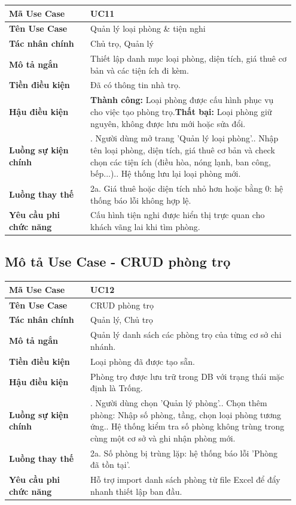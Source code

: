 \documentclass[a4paper,oneside]{report}
\begin{document}
\begin{longtable}[]{@{}>{\RaggedRight\arraybackslash}p{0.27\linewidth}>{\RaggedRight\arraybackslash}p{0.68\linewidth}@{}}
\toprule
\textbf{Mã Use Case} & UC11\tabularnewline
\midrule
\endhead
\textbf{Tên Use Case} & Quản lý loại phòng \& tiện nghi\tabularnewline
\textbf{Tác nhân chính} & Chủ trọ, Quản lý\tabularnewline
\textbf{Mô tả ngắn} & Thiết lập danh mục loại phòng, diện tích, giá thuê
cơ bản và các tiện ích đi kèm.\tabularnewline
\textbf{Tiền điều kiện} & Đã có thông tin nhà trọ.\tabularnewline
\textbf{Hậu điều kiện} & \textbf{Thành công:} Loại phòng được cấu hình phục vụ cho việc tạo phòng trọ.\newline \textbf{Thất bại:} Loại phòng giữ nguyên, không được lưu mới hoặc sửa đổi.\tabularnewline
\textbf{Luồng sự kiện chính} & 1. Người dùng mở trang
'Quản lý loại phòng'.\newline 2. Nhập tên loại phòng, diện tích,
giá thuê cơ bản và check chọn các tiện ích (điều hòa, nóng lạnh, ban
công, bếp...).\newline 3. Hệ thống lưu lại loại phòng
mới.\tabularnewline
\textbf{Luồng thay thế} & 2a. Giá thuê hoặc diện tích nhỏ hơn hoặc bằng
0: hệ thống báo lỗi không hợp lệ.\tabularnewline
\textbf{Yêu cầu phi chức năng} & Cấu hình tiện nghi được hiển thị trực
quan cho khách vãng lai khi tìm phòng.\tabularnewline
\bottomrule
\end{longtable}

\subsection{Mô tả Use Case - CRUD phòng trọ}

\begin{longtable}[]{@{}>{\RaggedRight\arraybackslash}p{0.27\linewidth}>{\RaggedRight\arraybackslash}p{0.68\linewidth}@{}}
\toprule
\textbf{Mã Use Case} & UC12\tabularnewline
\midrule
\endhead
\textbf{Tên Use Case} & CRUD phòng trọ\tabularnewline
\textbf{Tác nhân chính} & Quản lý, Chủ trọ\tabularnewline
\textbf{Mô tả ngắn} & Quản lý danh sách các phòng trọ của từng cơ sở chi
nhánh.\tabularnewline
\textbf{Tiền điều kiện} & Loại phòng đã được tạo sẵn.\tabularnewline
\textbf{Hậu điều kiện} & Phòng trọ được lưu trữ trong DB với trạng thái
mặc định là Trống.\tabularnewline
\textbf{Luồng sự kiện chính} & 1. Người dùng chọn
'Quản lý phòng'.\newline 2. Chọn thêm phòng: Nhập số phòng, tầng,
chọn loại phòng tương ứng.\newline 3. Hệ thống kiểm tra số phòng
không trùng trong cùng một cơ sở và ghi nhận phòng mới.\tabularnewline
\textbf{Luồng thay thế} & 2a. Số phòng bị trùng lặp: hệ thống báo lỗi
'Phòng đã tồn tại'.\tabularnewline
\textbf{Yêu cầu phi chức năng} & Hỗ trợ import danh sách phòng từ file
Excel để đẩy nhanh thiết lập ban đầu.\tabularnewline
\bottomrule
\end{longtable}
\end{document}
